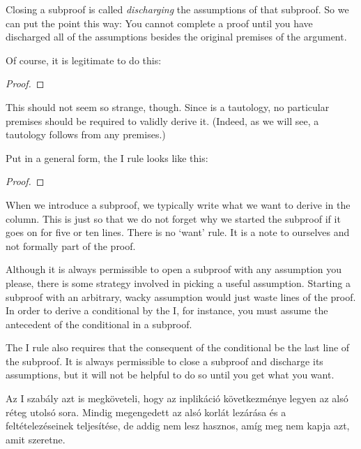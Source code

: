 Closing a subproof is called \emph{discharging} the assumptions of that subproof. So we can put the point this way: You cannot complete a proof until you have discharged all of the assumptions besides the original premises of the argument.

Of course, it is legitimate to do this:

\begin{proof}
	\open
		 
	\close
	 
\end{proof}

This should not seem so strange, though. Since \eif{} is a tautology, no particular premises should be required to validly derive it. (Indeed, as we will see, a tautology follows from any premises.)

Put in a general form, the {\eif}I rule looks like this:

\begin{proof}
	\open
		 
	\close
\end{proof}

When we introduce a subproof, we typically write what we want to derive in the column. This is just so that we do not forget why we started the subproof if it goes on for five or ten lines. There is no `want' rule. It is a note to ourselves and not formally part of the proof.

Although it is always permissible to open a subproof with any assumption you please, there is some strategy involved in picking a useful assumption. Starting a subproof with an arbitrary, wacky assumption would just waste lines of the proof. In order to derive a conditional by the {\eif}I, for instance, you must assume the antecedent of the conditional in a subproof.



The {\eif}I rule also requires that the consequent of the conditional be the last line of the subproof. It is always permissible to close a subproof and discharge its assumptions, but it will not be helpful to do so until you get what you want.

Az {\eif}I szabály azt is megköveteli, hogy az inplikáció következménye legyen az alsó réteg utolsó sora. Mindig megengedett az alsó korlát lezárása és a feltételezéseinek teljesítése, de addig nem lesz hasznos, amíg meg nem kapja azt, amit szeretne.

